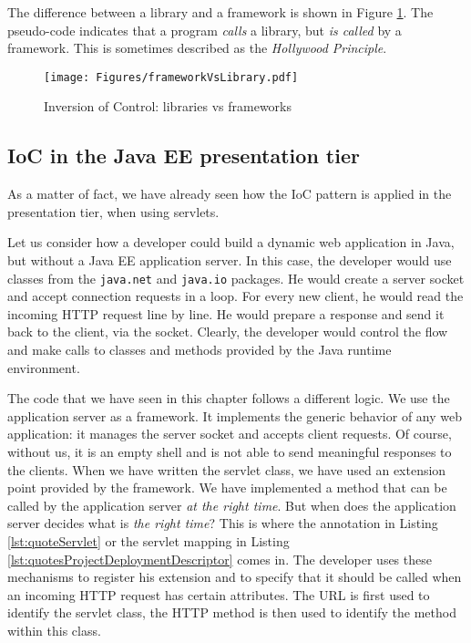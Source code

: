 The difference between a library and a framework is shown in Figure \ref{fig:library-vs-framework}. The pseudo-code indicates that a program \emph{calls} a library, but \emph{is called} by a framework. This is sometimes described as the \emph{Hollywood Principle}.

\begin{figure}[]
	\centering
    \texttt{[image: Figures/frameworkVsLibrary.pdf]}
	\caption{Inversion of Control: libraries vs frameworks}
  \label{fig:library-vs-framework}
\end{figure}

\subsection{IoC in the Java EE presentation tier}

As a matter of fact, we have already seen how the \ac{IoC} pattern is applied in the presentation tier, when using servlets.

Let us consider how a developer could build a dynamic web application in Java, but without a Java EE application server. In this case, the developer would use classes from the \texttt{java.net} and \texttt{java.io} packages. He would create a server socket and accept connection requests in a loop. For every new client, he would read the incoming HTTP request line by line. He would prepare a response and send it back to the client, via the socket. Clearly, the developer would control the flow and make calls to classes and methods provided by the Java runtime environment.

The code that we have seen in this chapter follows a different logic. We use the application server as a framework. It implements the generic behavior of any web application: it manages the server socket and accepts client requests. Of course, without us, it is an empty shell and is not able to send meaningful responses to the clients. When we have written the servlet class, we have used an extension point provided by the framework. We have implemented a method that can be called by the application server \emph{at the right time}. But when does the application server decides what is \emph{the right time}? This is where the annotation in Listing \ref{lst:quoteServlet} or the servlet mapping in Listing \ref{lst:quotesProjectDeploymentDescriptor} comes in. The developer uses these mechanisms to register his extension and to specify that it should be called when an incoming HTTP request has certain attributes. The URL is first used to identify the servlet class, the HTTP method is then used to identify the method within this class.

